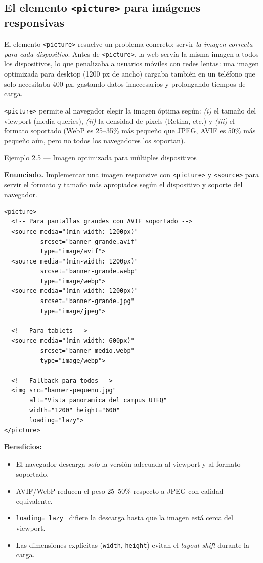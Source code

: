 \subsection{El elemento \texttt{<picture>} para imágenes responsivas}

El elemento \texttt{<picture>} resuelve un problema concreto: servir
\emph{la imagen correcta para cada dispositivo}. Antes de
\texttt{<picture>}, la web servía la misma imagen a todos los
dispositivos, lo que penalizaba a usuarios móviles con redes lentas:
una imagen optimizada para desktop (1200 px de ancho) cargaba
también en un teléfono que solo necesitaba 400 px, gastando datos
innecesarios y prolongando tiempos de carga.

\texttt{<picture>} permite al navegador elegir la imagen óptima
según: \emph{(i)} el tamaño del viewport (media queries), \emph{(ii)}
la densidad de pixels (Retina, etc.) y \emph{(iii)} el formato
soportado (WebP es 25--35\% más pequeño que JPEG, AVIF es 50\% más
pequeño aún, pero no todos los navegadores los soportan).

\begin{cajaejemplo}{Ejemplo 2.5 --- Imagen optimizada para múltiples dispositivos}

\textbf{Enunciado.} Implementar una imagen responsive con \texttt{<picture>} y \texttt{<source>} para servir el formato y tamaño más apropiados según el dispositivo y soporte del navegador.

\begin{lstlisting}[style=html,caption={Ejemplo de HTML},label=lst:2.9]
<picture>
  <!-- Para pantallas grandes con AVIF soportado -->
  <source media="(min-width: 1200px)"
          srcset="banner-grande.avif"
          type="image/avif">
  <source media="(min-width: 1200px)"
          srcset="banner-grande.webp"
          type="image/webp">
  <source media="(min-width: 1200px)"
          srcset="banner-grande.jpg"
          type="image/jpeg">

  <!-- Para tablets -->
  <source media="(min-width: 600px)"
          srcset="banner-medio.webp"
          type="image/webp">

  <!-- Fallback para todos -->
  <img src="banner-pequeno.jpg"
       alt="Vista panoramica del campus UTEQ"
       width="1200" height="600"
       loading="lazy">
</picture>
\end{lstlisting}
\textbf{Beneficios:}
\begin{itemize}
\item El navegador descarga \emph{solo} la versión adecuada al
viewport y al formato soportado.
\item AVIF/WebP reducen el peso 25--50\% respecto a JPEG con calidad
equivalente.
\item \texttt{loading= lazy } difiere la descarga hasta que la
imagen está cerca del viewport.
\item Las dimensiones explícitas (\texttt{width}, \texttt{height})
evitan el \emph{layout shift} durante la carga.
\end{itemize}
\end{cajaejemplo}

